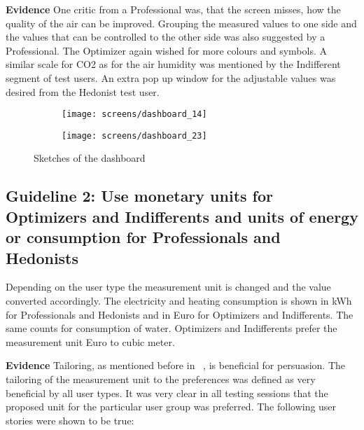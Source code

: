 \textbf{Evidence} \quad One critic from a Professional was, that the screen misses, how the quality of the air can be improved. Grouping the measured values to one side and the values that can be controlled to the other side was also suggested by a Professional. The Optimizer again wished for more colours and symbols. A similar scale for CO2 as for the air humidity was mentioned by the Indifferent segment of test users. An extra pop up window for the adjustable values was desired from the Hedonist test user.

\begin{figure}[h]
	\centering
	\begin{subfigure}[b]{0.24\columnwidth}
		\centering
		\texttt{[image: screens/dashboard\_14]}
		\label{fig:dasboard:professional}
	\end{subfigure}
	\begin{subfigure}[b]{0.24\columnwidth}
		\centering
		\texttt{[image: screens/dashboard\_23]}
		\label{fig:dashboard:optimizer}
	\end{subfigure}
	\caption{Sketches of the dashboard}
	\label{fig:dashboard} %
\end{figure}

\subsection*{Guideline 2: Use monetary units for Optimizers and Indifferents and units of energy or consumption for Professionals and Hedonists}

Depending on the user type the measurement unit is changed and the value converted accordingly. The electricity and heating consumption is shown in kWh for Professionals and Hedonists and in Euro for Optimizers and Indifferents. The same counts for consumption of water. Optimizers and Indifferents prefer the measurement unit Euro to cubic meter.

\textbf{Evidence} \quad Tailoring, as mentioned before in ~, is beneficial for persuasion. The tailoring of the measurement unit to the preferences was defined as very beneficial by all user types. It was very clear in all testing sessions that the proposed unit for the particular user group was preferred. The following user stories were shown to be true: 

